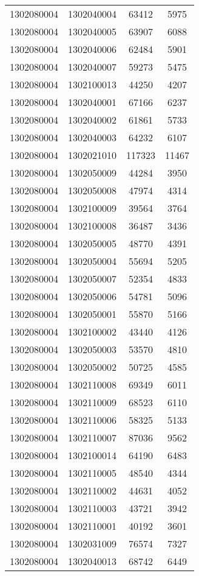 \begin{longtable}[h]{llcc}
		1302080004 & 1302040004 & 63412 & 5975\\
		1302080004 & 1302040005 & 63907 & 6088\\
		1302080004 & 1302040006 & 62484 & 5901\\
		1302080004 & 1302040007 & 59273 & 5475\\
		1302080004 & 1302100013 & 44250 & 4207\\
		1302080004 & 1302040001 & 67166 & 6237\\
		1302080004 & 1302040002 & 61861 & 5733\\
		1302080004 & 1302040003 & 64232 & 6107\\
		1302080004 & 1302021010 & 117323 & 11467\\
		1302080004 & 1302050009 & 44284 & 3950\\
		1302080004 & 1302050008 & 47974 & 4314\\
		1302080004 & 1302100009 & 39564 & 3764\\
		1302080004 & 1302100008 & 36487 & 3436\\
		1302080004 & 1302050005 & 48770 & 4391\\
		1302080004 & 1302050004 & 55694 & 5205\\
		1302080004 & 1302050007 & 52354 & 4833\\
		1302080004 & 1302050006 & 54781 & 5096\\
		1302080004 & 1302050001 & 55870 & 5166\\
		1302080004 & 1302100002 & 43440 & 4126\\
		1302080004 & 1302050003 & 53570 & 4810\\
		1302080004 & 1302050002 & 50725 & 4585\\
		1302080004 & 1302110008 & 69349 & 6011\\
		1302080004 & 1302110009 & 68523 & 6110\\
		1302080004 & 1302110006 & 58325 & 5133\\
		1302080004 & 1302110007 & 87036 & 9562\\
		1302080004 & 1302100014 & 64190 & 6483\\
		1302080004 & 1302110005 & 48540 & 4344\\
		1302080004 & 1302110002 & 44631 & 4052\\
		1302080004 & 1302110003 & 43721 & 3942\\
		1302080004 & 1302110001 & 40192 & 3601\\
		1302080004 & 1302031009 & 76574 & 7327\\
		1302080004 & 1302040013 & 68742 & 6449\\

\end{longtable}
